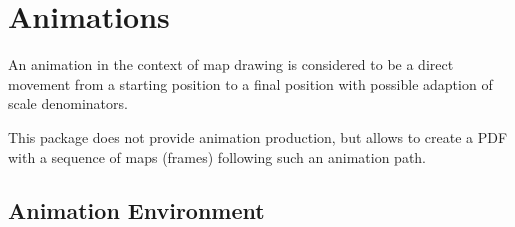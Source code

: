 \clearpage
\section{Animations}\label{sec:animations}%

An animation in the context of map drawing is considered to be a direct movement
from a starting position to a final position with possible adaption of
scale denominators.

This package does not provide animation production, but allows to create a
PDF with a sequence of maps (frames) following such an animation path.


\subsection{Animation Environment}

